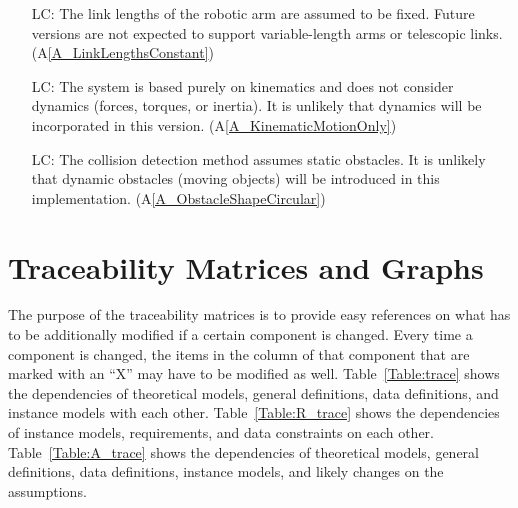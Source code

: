 \documentclass[12pt]{article}
\newcommand{\aref}[1]{A\ref{#1}}
\newcounter{lcnum} %
\begin{document}
  \noindent \begin{itemize}
  
  \item[LC\refstepcounter{lcnum}\thelcnum\label{LC_FixedLinkLengths}:]  
  The link lengths of the robotic arm are assumed to be fixed. Future versions are not expected to support variable-length arms or telescopic links. (\aref{A_LinkLengthsConstant})
  
  
  \item[LC\refstepcounter{lcnum}\thelcnum\label{LC_NoDynamics}:]  
  The system is based purely on kinematics and does not consider dynamics (forces, torques, or inertia). It is unlikely that dynamics will be incorporated in this version. (\aref{A_KinematicMotionOnly})
  
  \item[LC\refstepcounter{lcnum}\thelcnum\label{LC_FixedCollisionDetection}:]  
  The collision detection method assumes static obstacles. It is unlikely that dynamic obstacles (moving objects) will be introduced in this implementation. (\aref{A_ObstacleShapeCircular})
  
  \end{itemize}
  

\section{Traceability Matrices and Graphs}

The purpose of the traceability matrices is to provide easy references on what
has to be additionally modified if a certain component is changed.  Every time a
component is changed, the items in the column of that component that are marked
with an ``X'' may have to be modified as well.  Table~\ref{Table:trace} shows the
dependencies of theoretical models, general definitions, data definitions, and
instance models with each other. Table~\ref{Table:R_trace} shows the
dependencies of instance models, requirements, and data constraints on each
other. Table~\ref{Table:A_trace} shows the dependencies of theoretical models,
general definitions, data definitions, instance models, and likely changes on
the assumptions.
\end{document}
